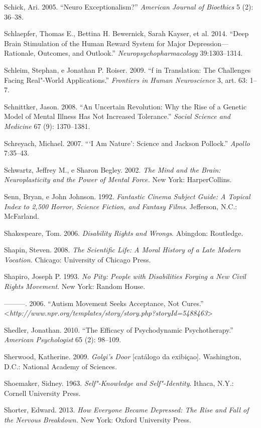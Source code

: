 Schick, Ari. 2005. ``Neuro Exceptionalism?'' \emph{American Journal of
Bioethics} 5 (2): 36--38.

Schlaepfer, Thomas E., Bettina H. Bewernick, Sarah Kayser, et al. 2014.
``Deep Brain Stimulation of the Human Reward System for Major
Depression---Rationale, Outcomes, and Outlook.''
\emph{Neuropsychopharmacology} 39:1303--1314.

Schleim, Stephan, e Jonathan P. Roiser. 2009. ``f in Translation: The
Challenges Facing Real"-World Applications.'' \emph{Frontiers in Human
Neuroscience} 3, art. 63: 1--7.

Schnittker, Jason. 2008. ``An Uncertain Revolution: Why the Rise of a
Genetic Model of Mental Illness Has Not Increased Tolerance.''
\emph{Social Science and Medicine} 67 (9): 1370--1381.

Schreyach, Michael. 2007. ```I Am Nature': Science and Jackson
Pollock.'' \emph{Apollo} 7:35--43.

Schwartz, Jeffrey M., e Sharon Begley. 2002. \emph{The Mind and the
Brain: Neuroplasticity and the Power of Mental Force.} New York:
HarperCollins.

Senn, Bryan, e John Johnson. 1992. \emph{Fantastic Cinema Subject Guide:
A Topical Index to 2,500 Horror, Science Fiction, and Fantasy Films}.
Jefferson, N.C.: McFarland.

Shakespeare, Tom. 2006. \emph{Disability Rights and Wrongs}. Abingdon:
Routledge.

Shapin, Steven. 2008. \emph{The Scientific Life: A Moral History of a
Late Modern Vocation.} Chicago: University of Chicago Press.

Shapiro, Joseph P. 1993. \emph{No Pity: People with Disabilities Forging
a New Civil Rights Movement}. New York: Random House.

---------. 2006. ``Autism Movement Seeks Acceptance, Not Cures.''
\textless{}\emph{http://www.npr.org/templates/story/story.php?storyId​=5488463}\textgreater{}

Shedler, Jonathan. 2010. ``The Efficacy of Psychodynamic
Psychotherapy.'' \emph{American Psychologist} 65 (2): 98--109.

Sherwood, Katherine. 2009. \emph{Golgi's Door} {[}catálogo da
exibiçao{]}. Washington, D.C.: National Academy of Sciences\emph{.}

Shoemaker, Sidney. 1963. \emph{Self"-Knowledge and Self"-Identity}.
Ithaca, N.Y.: Cornell University Press.

Shorter, Edward. 2013. \emph{How Everyone Became Depressed: The Rise and
Fall of the Nervous Breakdown.} New York: Oxford University Press.

